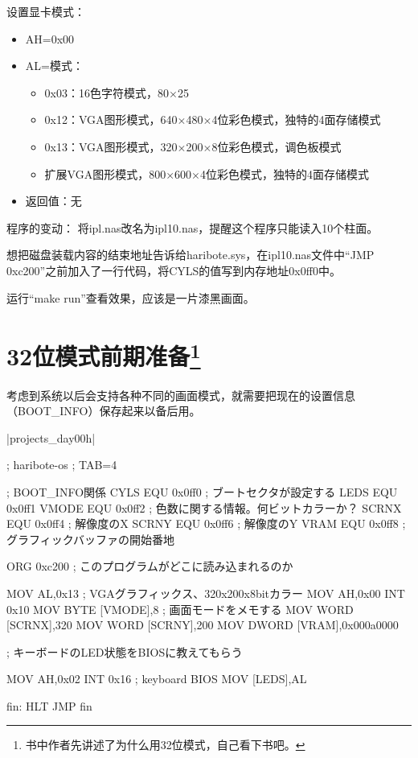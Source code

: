 设置显卡模式：
\begin{itemize}
  \item AH=0x00
  \item AL=模式：
  \begin{itemize}
    \item 0x03：16色字符模式，80$\times$25
    \item 0x12：VGA图形模式，640$\times$480$\times$4位彩色模式，独特的4面存储模式
    \item 0x13：VGA图形模式，320$\times$200$\times$8位彩色模式，调色板模式
    \item 扩展VGA图形模式，800$\times$600$\times$4位彩色模式，独特的4面存储模式
  \end{itemize}
  \item 返回值：无
\end{itemize}

程序的变动：
将ipl.nas改名为ipl10.nas，提醒这个程序只能读入10个柱面。

想把磁盘装载内容的结束地址告诉给haribote.sys，在ipl10.nas文件中“JMP 0xc200”之前加入了一行代码，将CYLS的值写到内存地址0x0ff0中。

运行“make run”查看效果，应该是一片漆黑画面。

\section[32位模式前期准备]{32位模式前期准备\protect\footnote{书中作者先讲述了为什么用32位模式，自己看下书吧。}}

考虑到系统以后会支持各种不同的画面模式，就需要把现在的设置信息（BOOT\_INFO）保存起来以备后用。

\dag|projects_day\harib00h|
\begin{code}[label=haribote.nas]
; haribote-os
; TAB=4

; BOOT_INFO関係
CYLS	EQU		0x0ff0			; ブートセクタが設定する
LEDS	EQU		0x0ff1
VMODE	EQU		0x0ff2			; 色数に関する情報。何ビットカラーか？
SCRNX	EQU		0x0ff4			; 解像度のX
SCRNY	EQU		0x0ff6			; 解像度のY
VRAM	EQU		0x0ff8			; グラフィックバッファの開始番地

		ORG		0xc200			; このプログラムがどこに読み込まれるのか

		MOV		AL,0x13			; VGAグラフィックス、320x200x8bitカラー
		MOV		AH,0x00
		INT		0x10
		MOV		BYTE [VMODE],8	; 画面モードをメモする
		MOV		WORD [SCRNX],320
		MOV		WORD [SCRNY],200
		MOV		DWORD [VRAM],0x000a0000

; キーボードのLED状態をBIOSに教えてもらう

		MOV		AH,0x02
		INT		0x16 			; keyboard BIOS
		MOV		[LEDS],AL

fin:
		HLT
		JMP		fin
\end{code}

